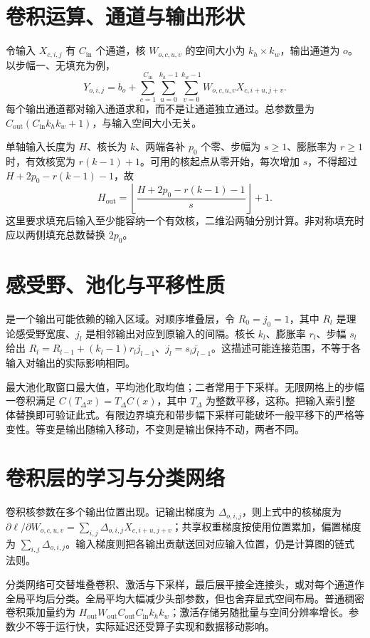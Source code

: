 \documentclass[UTF8,12pt,a4paper,fontset=fandol]{ctexbook}
\begin{document}
\section{卷积运算、通道与输出形状}
令输入 $X_{c,i,j}$ 有 $C_{\mathrm{in}}$ 个通道，核 $W_{o,c,u,v}$ 的空间大小为 $k_h\times k_w$，输出通道为 $o$。以步幅一、无填充为例，
\[
Y_{o,i,j}=b_o+\sum_{c=1}^{C_{\mathrm{in}}}\sum_{u=0}^{k_h-1}\sum_{v=0}^{k_w-1}W_{o,c,u,v}X_{c,i+u,j+v}.
\]
每个输出通道都对输入通道求和，而不是让通道独立通过。总参数量为 $C_{\mathrm{out}}(C_{\mathrm{in}}k_hk_w+1)$，与输入空间大小无关。

单轴输入长度为 $H$、核长为 $k$、两端各补 $p_0$ 个零、步幅为 $s\geq1$、膨胀率为 $r\geq1$ 时，有效核宽为 $r(k-1)+1$。可用的核起点从零开始，每次增加 $s$，不得超过 $H+2p_0-r(k-1)-1$，故
\begin{equation}
H_{\mathrm{out}}=\left\lfloor\frac{H+2p_0-r(k-1)-1}{s}\right\rfloor+1.
\label{eq:dl-conv-shape}
\end{equation}
这里要求填充后输入至少能容纳一个有效核，二维沿两轴分别计算。非对称填充时应以两侧填充总数替换 $2p_0$。

\section{感受野、池化与平移性质}
是一个输出可能依赖的输入区域。对顺序堆叠层，令 $R_0=j_0=1$，其中 $R_l$ 是理论感受野宽度、$j_l$ 是相邻输出对应到原输入的间隔。核长 $k_l$、膨胀率 $r_l$、步幅 $s_l$ 给出 $R_l=R_{l-1}+(k_l-1)r_lj_{l-1}$、$j_l=s_lj_{l-1}$。这描述可能连接范围，不等于各输入对输出的实际影响相同。

最大池化取窗口最大值，平均池化取均值；二者常用于下采样。无限网格上的步幅一卷积满足 $C(T_\Delta x)=T_\Delta C(x)$，其中 $T_\Delta$ 为整数平移，这称。把输入索引整体替换即可验证此式。有限边界填充和带步幅下采样可能破坏一般平移下的严格等变性。等变是输出随输入移动，不变则是输出保持不动，两者不同。

\section{卷积层的学习与分类网络}
卷积核参数在多个输出位置出现。记输出梯度为 $\Delta_{o,i,j}$，则上式中的核梯度为 $\partial\ell/\partial W_{o,c,u,v}=\sum_{i,j}\Delta_{o,i,j}X_{c,i+u,j+v}$；共享权重梯度按使用位置累加，偏置梯度为 $\sum_{i,j}\Delta_{o,i,j}$。输入梯度则把各输出贡献送回对应输入位置，仍是计算图的链式法则。

分类网络可交替堆叠卷积、激活与下采样，最后展平接全连接头，或对每个通道作全局平均后分类。全局平均大幅减少头部参数，但也舍弃显式空间布局。普通稠密卷积乘加量约为 $H_{\mathrm{out}}W_{\mathrm{out}}C_{\mathrm{out}}C_{\mathrm{in}}k_hk_w$；激活存储另随批量与空间分辨率增长。参数少不等于运行快，实际延迟还受算子实现和数据移动影响。
\end{document}
